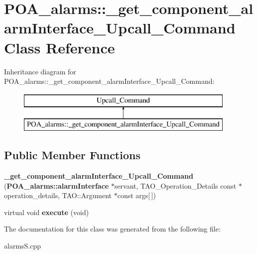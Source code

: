 \section{P\+O\+A\+\_\+alarms\+:\+:\+\_\+get\+\_\+component\+\_\+alarm\+Interface\+\_\+\+Upcall\+\_\+\+Command Class Reference}
\label{classPOA__alarms_1_1__get__component__alarmInterface__Upcall__Command}
Inheritance diagram for P\+O\+A\+\_\+alarms\+:\+:\+\_\+get\+\_\+component\+\_\+alarm\+Interface\+\_\+\+Upcall\+\_\+\+Command\+:\begin{figure}[H]
\begin{center}
\leavevmode
\includegraphics[height=2.000000cm]{classPOA__alarms_1_1__get__component__alarmInterface__Upcall__Command}
\end{center}
\end{figure}
\subsection*{Public Member Functions}
\begin{DoxyCompactItemize}
\item 
{\bfseries \+\_\+get\+\_\+component\+\_\+alarm\+Interface\+\_\+\+Upcall\+\_\+\+Command} ({\bf P\+O\+A\+\_\+alarms\+::alarm\+Interface} $\ast$servant, T\+A\+O\+\_\+\+Operation\+\_\+\+Details const $\ast$operation\+\_\+details, T\+A\+O\+::\+Argument $\ast$const args[$\,$])\label{classPOA__alarms_1_1__get__component__alarmInterface__Upcall__Command_a41e45bf8f70395545fed1a957eaee046}

\item 
virtual void {\bfseries execute} (void)\label{classPOA__alarms_1_1__get__component__alarmInterface__Upcall__Command_ac72059a0342c1b63a8dee4ebb406b0d3}

\end{DoxyCompactItemize}


The documentation for this class was generated from the following file\+:\begin{DoxyCompactItemize}
\item 
alarms\+S.\+cpp\end{DoxyCompactItemize}
